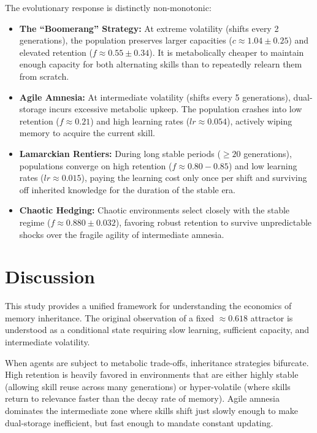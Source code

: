 \documentclass[11pt,a4paper]{article}
\begin{document}
The evolutionary response is distinctly non-monotonic:
\begin{itemize}
    \item \textbf{The ``Boomerang'' Strategy:} At extreme volatility (shifts every 2 generations), the population preserves larger capacities ($c \approx 1.04 \pm 0.25$) and elevated retention ($f \approx 0.55 \pm 0.34$). It is metabolically cheaper to maintain enough capacity for both alternating skills than to repeatedly relearn them from scratch.
    \item \textbf{Agile Amnesia:} At intermediate volatility (shifts every 5 generations), dual-storage incurs excessive metabolic upkeep. The population crashes into low retention ($f \approx 0.21$) and high learning rates ($lr \approx 0.054$), actively wiping memory to acquire the current skill.
    \item \textbf{Lamarckian Rentiers:} During long stable periods ($\ge 20$ generations), populations converge on high retention ($f \approx 0.80 - 0.85$) and low learning rates ($lr \approx 0.015$), paying the learning cost only once per shift and surviving off inherited knowledge for the duration of the stable era.
    \item \textbf{Chaotic Hedging:} Chaotic environments select closely with the stable regime ($f \approx 0.880 \pm 0.032$), favoring robust retention to survive unpredictable shocks over the fragile agility of intermediate amnesia.
\end{itemize}

\section{Discussion}
This study provides a unified framework for understanding the economics of memory inheritance. The original observation of a fixed $\approx 0.618$ attractor is understood as a conditional state requiring slow learning, sufficient capacity, and intermediate volatility.

When agents are subject to metabolic trade-offs, inheritance strategies bifurcate. High retention is heavily favored in environments that are either highly stable (allowing skill reuse across many generations) or hyper-volatile (where skills return to relevance faster than the decay rate of memory). Agile amnesia dominates the intermediate zone where skills shift just slowly enough to make dual-storage inefficient, but fast enough to mandate constant updating.
\end{document}
